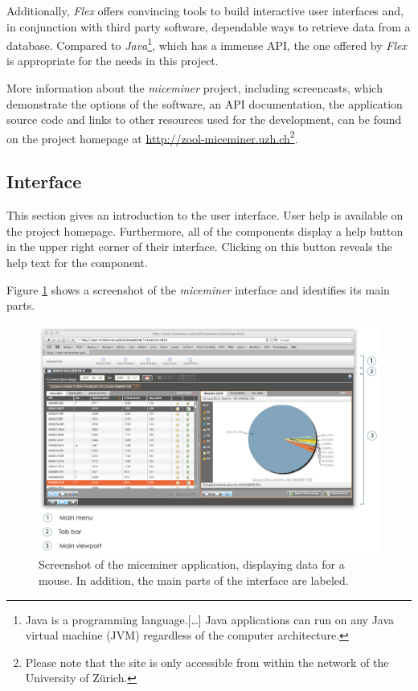 Additionally, \textit{Flex} offers convincing tools to build interactive user interfaces and, in conjunction with third party software, dependable ways to retrieve data from a database. Compared to \textit{Java}\footnote{Java is a programming language.[\ldots] Java applications can run on any Java virtual machine (JVM) regardless of the computer architecture\cite{wiki:java}.}, which has a immense \ac{API}, the one offered by \textit{Flex} is appropriate for the needs in this project.

More information about the \textit{miceminer} project, including screencasts, which demonstrate the options of the software, an \ac{API} documentation, the application source code and links to other resources used for the development, can be found on the project homepage at \href{http://zool-miceminer.uzh.ch/}{http://zool-miceminer.uzh.ch}\footnote{Please note that the site is only accessible from within the network of the University of Z\"urich.}. 

\subsection{Interface}
\label{subsec:miceminer_interface}

This section gives an introduction to the user interface. User help is available on the project homepage. Furthermore, all of the components display a help button in the upper right corner of their interface. Clicking on this button reveals the help text for the component.

Figure \ref{fig:interface_overview} shows a screenshot of the \textit{miceminer} interface and identifies its main parts.

\begin{figure}
  \includegraphics[width=\textwidth]{assets/pdf/interface_overview.pdf}
  \caption[miceminer interface overview]{Screenshot of the miceminer application, displaying data for a mouse. In addition, the main parts of the interface are labeled.}
  \label{fig:interface_overview}
\end{figure}

